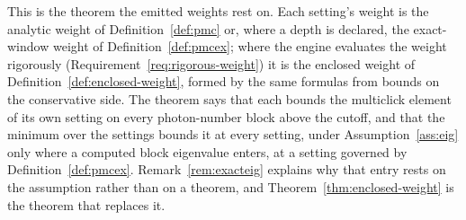 
This is the theorem the emitted weights rest on. Each setting's weight is
the analytic weight of Definition~\ref{def:pmc} or, where a depth is
declared, the exact-window weight of Definition~\ref{def:pmcex}; where the
engine evaluates the weight rigorously (Requirement~\ref{req:rigorous-weight})
it is the enclosed weight of Definition~\ref{def:enclosed-weight}, formed by
the same formulas from bounds on the conservative side. The theorem says that
each bounds the multiclick element of its own setting on every
photon-number block above the cutoff, and that the minimum over the settings
bounds it at every setting, under Assumption~\ref{ass:eig} only where a
computed block eigenvalue enters, at a setting governed by
Definition~\ref{def:pmcex}. Remark~\ref{rem:exacteig} explains why that entry
rests on the assumption rather than on a theorem, and
Theorem~\ref{thm:enclosed-weight} is the theorem that replaces it.


